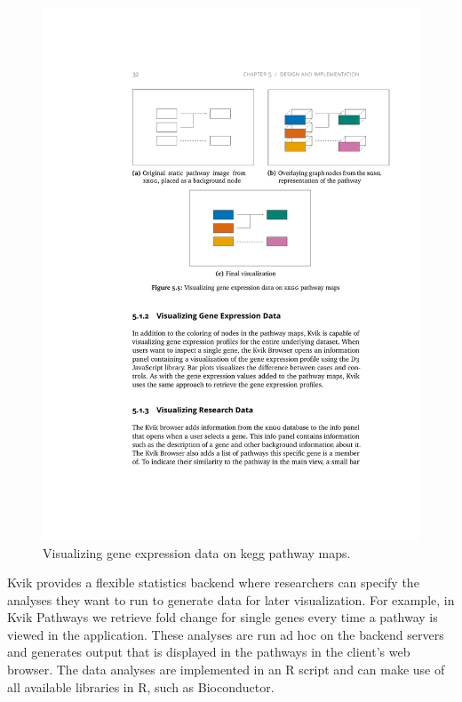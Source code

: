 \begin{figure}[htb]
    \begin{centering}
    \includegraphics[width=\textwidth]{figures/how2pathway.pdf}
        \caption{Visualizing gene expression data on \gls{kegg} pathway maps.} 
    \label{fig:how2pathway}
    \end{centering} 
\end{figure}   

Kvik provides a flexible statistics backend where researchers can specify the
analyses they want to run to generate data for later visualization. For example,
in Kvik Pathways we retrieve fold change for single genes every time a pathway
is viewed in the application.  These analyses are run ad hoc on the backend
servers and generates output that is displayed in the pathways in the client's
web browser. The data analyses are implemented in an R script and can make use
of all available libraries in R, such as Bioconductor. 

